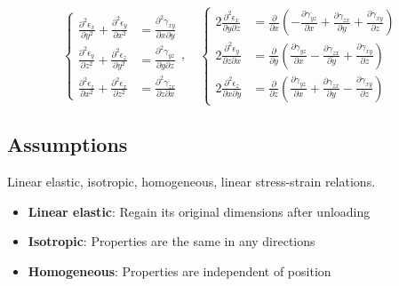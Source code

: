 \documentclass[en,hazy,cyan,8pt,normal]{elegantnote}
\numberwithin{equation}{section}
\begin{document}
  \begin{equation}\label{eq:053}
    \left\{
      \begin{aligned}
        \frac{\partial^2 \epsilon_x}{\partial y^2} + \frac{\partial^2 \epsilon_y}{\partial x^2} &= \frac{\partial^2 \gamma_{xy}}{\partial x \partial y} \\
        \frac{\partial^2 \epsilon_y}{\partial z^2} + \frac{\partial^2 \epsilon_z}{\partial y^2} &= \frac{\partial^2 \gamma_{yz}}{\partial y \partial z} \\
        \frac{\partial^2 \epsilon_z}{\partial x^2} + \frac{\partial^2 \epsilon_x}{\partial z^2} &= \frac{\partial^2 \gamma_{zx}}{\partial z \partial x}
      \end{aligned}
    \right.
    , \quad
    \left\{
      \begin{aligned}
        2 \frac{\partial^2 \epsilon_x}{\partial y \partial z} &= \frac{\partial}{\partial x} \left( -\frac{\partial \gamma_{yz}}{\partial x} + \frac{\partial \gamma_{zx}}{\partial y} + \frac{\partial \gamma_{xy}}{\partial z} \right) \\
        2 \frac{\partial^2 \epsilon_y}{\partial z \partial x} &= \frac{\partial}{\partial y} \left( \frac{\partial \gamma_{yz}}{\partial x} - \frac{\partial \gamma_{zx}}{\partial y} + \frac{\partial \gamma_{xy}}{\partial z} \right) \\
        2 \frac{\partial^2 \epsilon_z}{\partial x \partial y} &= \frac{\partial}{\partial z} \left( \frac{\partial \gamma_{yz}}{\partial x} + \frac{\partial \gamma_{zx}}{\partial y} - \frac{\partial \gamma_{xy}}{\partial z} \right)
      \end{aligned}
    \right.
  \end{equation}

  \subsection{Assumptions}\label{subsec:03.01}

    Linear elastic, isotropic, homogeneous, linear stress-strain relations.

    \begin{itemize}
      \item \textbf{Linear elastic}: Regain its original dimensions after unloading
      \item \textbf{Isotropic}: Properties are the same in any directions
      \item \textbf{Homogeneous}: Properties are independent of position
    \end{itemize}
\end{document}
